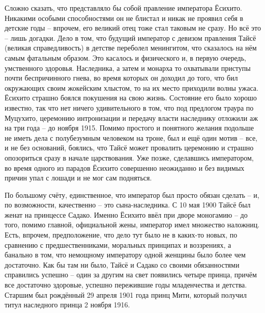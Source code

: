 Сложно сказать, что представляло бы собой правление императора Ёсихито. Никакими особыми способностями он не блистал и никак не проявил себя в детские годы – впрочем, его великий отец тоже стал таковым не сразу. Но всё это – лишь догадки. Дело в том, что будущий император с девизом правления Тайсё (великая справедливость) в детстве переболел менингитом, что сказалось на нём самым фатальным образом. Это касалось и физического и, в первую очередь, умственного здоровья. Наследника, а затем и монарха то охватывали приступы почти беспричинного гнева, во время которых он доходил до того, что бил окружающих своим жокейским хлыстом, то на их место приходили волны ужаса. Ёсихито страшно боялся покушения на свою жизнь. Состояние его было хорошо известно, так что нет ничего удивительного в том, что под предлогом траура по Муцухито, церемонию интронизации и передачу власти наследнику отложили аж на три года – до ноября 1915. Помимо простого и понятного желания подольше не иметь дела с полубезумным человеком на троне, был и ещё один мотив – все, и не без оснований, боялись, что Тайсё может провалить церемонию и страшно опозориться сразу в начале царствования. Уже позже, сделавшись императором, во время одного из парадов Ёсихито совершенно неожиданно и без видимых причин упал с лошади и не мог сам подняться.

По большому счёту, единственное, что император был просто обязан сделать – и, по возможности, качественно – это сына-наследника. С 10 мая 1900 Тайсё был женат на принцессе Садако. Именно Ёсихито ввёл при дворе моногамию – до того, помимо главной, официальной жены, император имел множество наложниц. Есть, впрочем, предположение, что дело тут было не в каких-то новых, по сравнению с предшественниками, моральных принципах и воззрениях, а банально в том, что немощному императору одной женщины было более чем достаточно. Как бы там ни было, Тайсё и Садако со своими обязанностями справились успешно – один за другим на свет появились четыре принца, причём все достаточно здоровые, успешно пережившие годы младенчества и детства. Старшим был рождённый 29 апреля 1901 года принц Мити, который получил титул наследного принца 2 ноября 1916. 

